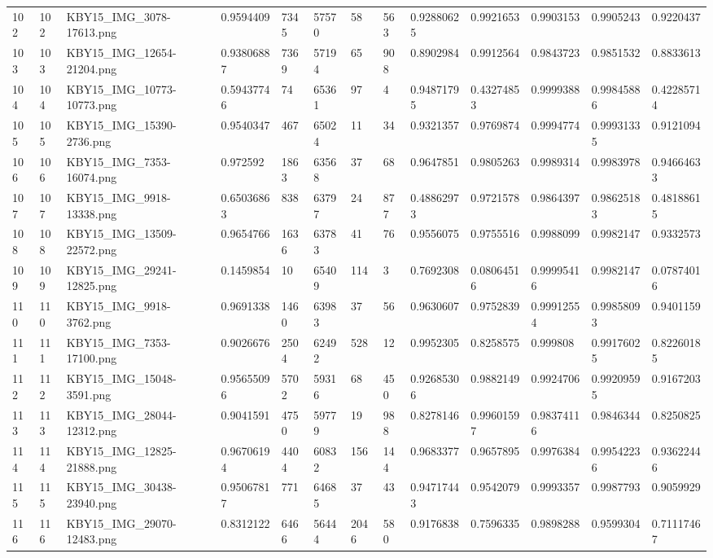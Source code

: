 \documentclass[11pt, a4paper, twoside]{report}
\begin{document}
\begin{longtable}[c]{@{}lllllllllllll@{}}
102 & 102 & KBY15\_IMG\_3078-17613.png & 0.9594409 & 7345 & 57570 & 58 & 563 & 0.92880625 & 0.9921653 & 0.9903153 & 0.9905243 & 0.9220437 \\
103 & 103 & KBY15\_IMG\_12654-21204.png & 0.93806887 & 7369 & 57194 & 65 & 908 & 0.8902984 & 0.9912564 & 0.9843723 & 0.9851532 & 0.8833613 \\
104 & 104 & KBY15\_IMG\_10773-10773.png & 0.59437746 & 74 & 65361 & 97 & 4 & 0.94871795 & 0.43274853 & 0.9999388 & 0.99845886 & 0.42285714 \\
105 & 105 & KBY15\_IMG\_15390-2736.png & 0.9540347 & 467 & 65024 & 11 & 34 & 0.9321357 & 0.9769874 & 0.9994774 & 0.99931335 & 0.9121094 \\
106 & 106 & KBY15\_IMG\_7353-16074.png & 0.972592 & 1863 & 63568 & 37 & 68 & 0.9647851 & 0.9805263 & 0.9989314 & 0.9983978 & 0.94664633 \\
107 & 107 & KBY15\_IMG\_9918-13338.png & 0.65036863 & 838 & 63797 & 24 & 877 & 0.48862973 & 0.9721578 & 0.9864397 & 0.98625183 & 0.48188615 \\
108 & 108 & KBY15\_IMG\_13509-22572.png & 0.9654766 & 1636 & 63783 & 41 & 76 & 0.9556075 & 0.9755516 & 0.9988099 & 0.9982147 & 0.9332573 \\
109 & 109 & KBY15\_IMG\_29241-12825.png & 0.1459854 & 10 & 65409 & 114 & 3 & 0.7692308 & 0.08064516 & 0.99995416 & 0.9982147 & 0.07874016 \\
110 & 110 & KBY15\_IMG\_9918-3762.png & 0.9691338 & 1460 & 63983 & 37 & 56 & 0.9630607 & 0.9752839 & 0.99912554 & 0.99858093 & 0.9401159 \\
111 & 111 & KBY15\_IMG\_7353-17100.png & 0.9026676 & 2504 & 62492 & 528 & 12 & 0.9952305 & 0.8258575 & 0.999808 & 0.99176025 & 0.82260185 \\
112 & 112 & KBY15\_IMG\_15048-3591.png & 0.95655096 & 5702 & 59316 & 68 & 450 & 0.92685306 & 0.9882149 & 0.9924706 & 0.99209595 & 0.9167203 \\
113 & 113 & KBY15\_IMG\_28044-12312.png & 0.9041591 & 4750 & 59779 & 19 & 988 & 0.8278146 & 0.99601597 & 0.98374116 & 0.9846344 & 0.8250825 \\
114 & 114 & KBY15\_IMG\_12825-21888.png & 0.96706194 & 4404 & 60832 & 156 & 144 & 0.9683377 & 0.9657895 & 0.9976384 & 0.99542236 & 0.93622446 \\
115 & 115 & KBY15\_IMG\_30438-23940.png & 0.95067817 & 771 & 64685 & 37 & 43 & 0.94717443 & 0.9542079 & 0.9993357 & 0.9987793 & 0.9059929 \\
116 & 116 & KBY15\_IMG\_29070-12483.png & 0.8312122 & 6466 & 56444 & 2046 & 580 & 0.9176838 & 0.7596335 & 0.9898288 & 0.9599304 & 0.71117467 \\

\end{longtable}
\end{document}
